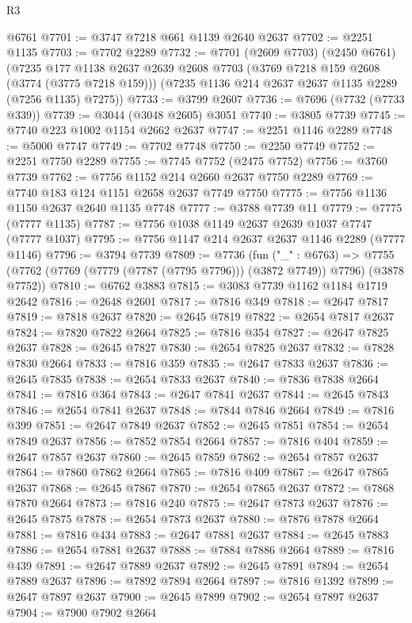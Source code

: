\begin{lexlean}{R3}
\begin{coremodule}
    @6761
@7701 := @3747 @7218 @661 @1139 @2640 @2637
@7702 := @2251 @1135
@7703 := @7702 @2289
@7732 := @7701
    (@2609 @7703)
    (@2450 @6761)
    (@7235
      @177
      @1138
      @2637
      @2639
      @2608
      @7703
      (@3769 @7218 @159 @2608 (@3774 (@3775 @7218 @159)))
      (@7235 @1136 @214 @2637 @2637 @1135 @2289 (@7256 @1135) @7275))
@7733 := @3799 @2607
@7736 := @7696 (@7732 (@7733 @339))
@7739 := @3044 (@3048 @2605) @3051
@7740 := @3805 @7739
@7745 := @7740 @223 @1002 @1154 @2662 @2637
@7747 := @2251 @1146 @2289
@7748 := @5000 @7747
@7749 := @7702 @7748
@7750 := @2250 @7749
@7752 := @2251 @7750 @2289
@7755 := @7745 @7752 (@2475 @7752)
@7756 := @3760 @7739
@7762 := @7756 @1152 @214 @2660 @2637 @7750 @2289
@7769 := @7740 @183 @124 @1151 @2658 @2637 @7749 @7750
@7775 := @7756 @1136 @1150 @2637 @2640 @1135 @7748
@7777 := @3788 @7739 @11
@7779 := @7775 (@7777 @1135)
@7787 := @7756 @1038 @1149 @2637 @2639 @1037 @7747 (@7777 @1037)
@7795 := @7756 @1147 @214 @2637 @2637 @1146 @2289 (@7777 @1146)
@7796 := @3794 @7739
@7809 := @7736
    (fun ("_" : @6763) =>
    @7755 (@7762 (@7769 (@7779 (@7787 (@7795 @7796))) (@3872 @7749)) @7796) (@3878 @7752))
@7810 := @6762 @3883
@7815 := @3083 @7739 @1162 @1184 @1719 @2642
@7816 := @2648 @2601
@7817 := @7816 @349
@7818 := @2647 @7817
@7819 := @7818 @2637
@7820 := @2645 @7819
@7822 := @2654 @7817 @2637
@7824 := @7820 @7822 @2664
@7825 := @7816 @354
@7827 := @2647 @7825 @2637
@7828 := @2645 @7827
@7830 := @2654 @7825 @2637
@7832 := @7828 @7830 @2664
@7833 := @7816 @359
@7835 := @2647 @7833 @2637
@7836 := @2645 @7835
@7838 := @2654 @7833 @2637
@7840 := @7836 @7838 @2664
@7841 := @7816 @364
@7843 := @2647 @7841 @2637
@7844 := @2645 @7843
@7846 := @2654 @7841 @2637
@7848 := @7844 @7846 @2664
@7849 := @7816 @399
@7851 := @2647 @7849 @2637
@7852 := @2645 @7851
@7854 := @2654 @7849 @2637
@7856 := @7852 @7854 @2664
@7857 := @7816 @404
@7859 := @2647 @7857 @2637
@7860 := @2645 @7859
@7862 := @2654 @7857 @2637
@7864 := @7860 @7862 @2664
@7865 := @7816 @409
@7867 := @2647 @7865 @2637
@7868 := @2645 @7867
@7870 := @2654 @7865 @2637
@7872 := @7868 @7870 @2664
@7873 := @7816 @240
@7875 := @2647 @7873 @2637
@7876 := @2645 @7875
@7878 := @2654 @7873 @2637
@7880 := @7876 @7878 @2664
@7881 := @7816 @434
@7883 := @2647 @7881 @2637
@7884 := @2645 @7883
@7886 := @2654 @7881 @2637
@7888 := @7884 @7886 @2664
@7889 := @7816 @439
@7891 := @2647 @7889 @2637
@7892 := @2645 @7891
@7894 := @2654 @7889 @2637
@7896 := @7892 @7894 @2664
@7897 := @7816 @1392
@7899 := @2647 @7897 @2637
@7900 := @2645 @7899
@7902 := @2654 @7897 @2637
@7904 := @7900 @7902 @2664

\end{coremodule}
\end{lexlean}
